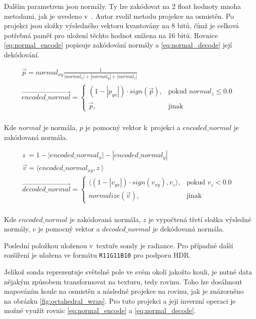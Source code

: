 Dalším parametrem jsou normály. Ty lze zakódovat na 2 float hodnoty mnoha metodami, jak je uvedeno v~\cite{Cigolle2014ASO}. Autor zvolil metodu projekce na osmistěn. Po projekci jsou složky výsledného vektoru kvantovány na 8 bitů, čímž je celková potřebná paměť pro uložení těchto hodnot snížena na 16 bitů. Rovnice \ref{eq:normal_encode} popisuje zakódování normály a \ref{eq:normal_decode} její dekódování.

\begin{equation} \label{eq:normal_encode}
	\begin{gathered}
		\vec{p} = normal_{xy} \frac{1}{|normal_x| + |normal_y| + |normal_z|} \\
		\vec{encoded\_normal} = \begin{cases}
            (1 - |p_{yx}|) \cdot sign(\vec{p}),& \text{pokud } normal_z \leq 0.0\\
            \vec{p},              & \text{jinak}
        \end{cases}\\
	\end{gathered}
\end{equation}

Kde $normal$ je normála, $p$ je pomocný vektor k~projekci a $encoded\_normal$ je zakódovaná normála.

\begin{equation} \label{eq:normal_decode}
	\begin{gathered}
	    z~= 1 - |encoded\_normal_x| - |encoded\_normal_y|\\
	    \vec{v} = \langle encoded\_normal_{xy}, z~\rangle\\
		\vec{decoded\_normal} = \begin{cases}
            \langle (1 - |v_{yx}|) \cdot sign(v_{xy}), v_z \rangle,& \text{pokud } v_z < 0.0\\
            normalize(\vec{v}),              & \text{jinak}
        \end{cases}\\
	\end{gathered}
\end{equation}

Kde $encoded\_normal$ je zakódovaná normála, $z$ je vypočtená třetí složka výsledné normály, $v$ je pomocný vektor a $decoded\_normal$ je dekódovaná normála.

Poslední položkou uloženou v~textuře sondy je radiance. Pro případné další rozšíření je uložena ve formátu \texttt{R11G11B10} pro podporu HDR.

Jelikož sonda reprezentuje světelné pole ve svém okolí jakožto kouli, je nutné data nějakým způsobem transformovat na texturu, tedy rovinu. Toho lze dosáhnout mapováním koule na osmistěn a následné projekce na rovinu, jak je znázorněno na obrázku \ref{fig:octahedral_wrap}. Pro tuto projekci a její inverzní operaci je možné využít rovnic \ref{eq:normal_encode} a \ref{eq:normal_decode}.

